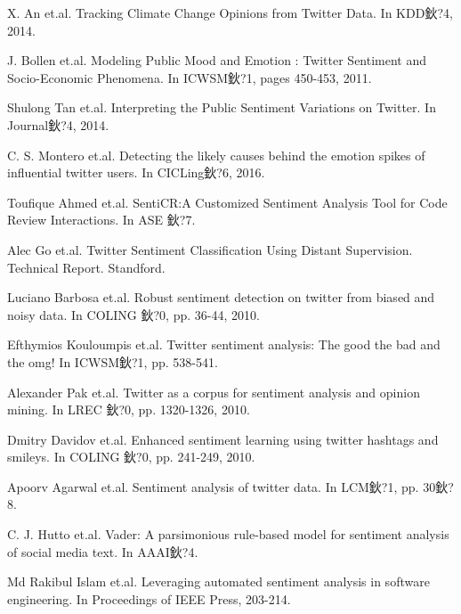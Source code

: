 \documentclass[runningheads]{llncs}
\begin{document}
\begin{thebibliography}{8}
X. An et.al.
\newblock Tracking Climate Change Opinions from Twitter Data. 
\newblock In KDD鈥?4, 2014.

J. Bollen et.al.
\newblock Modeling Public Mood and Emotion : Twitter Sentiment and Socio-Economic Phenomena. 
\newblock In ICWSM鈥?1, pages 450-453, 2011.

Shulong Tan et.al.
\newblock Interpreting the Public Sentiment Variations on Twitter. 
\newblock In Journal鈥?4, 2014.

C. S. Montero et.al.
\newblock Detecting the likely causes behind the emotion spikes of influential twitter users. 
\newblock In CICLing鈥?6, 2016.

Toufique Ahmed et.al.
\newblock SentiCR:A Customized Sentiment Analysis Tool for Code Review Interactions.
\newblock In ASE 鈥?7.

Alec Go et.al.
\newblock Twitter Sentiment Classification Using Distant Supervision.
\newblock Technical Report. Standford.

Luciano Barbosa et.al.
\newblock Robust sentiment detection on twitter from biased and noisy data.
\newblock In COLING 鈥?0, pp. 36-44, 2010.

Efthymios Kouloumpis et.al.
\newblock Twitter sentiment analysis: The good the bad and the omg!
\newblock In ICWSM鈥?1, pp. 538-541.

Alexander Pak et.al.
\newblock Twitter as a corpus for sentiment analysis and opinion mining.
\newblock In LREC 鈥?0, pp. 1320-1326, 2010.

Dmitry Davidov et.al.
\newblock Enhanced sentiment learning using twitter hashtags and smileys.
\newblock In COLING 鈥?0, pp. 241-249, 2010.

Apoorv Agarwal et.al.
\newblock Sentiment analysis of twitter data.
\newblock In LCM鈥?1, pp. 30鈥?8.

C. J. Hutto et.al.
\newblock Vader: A parsimonious rule-based model for sentiment analysis of social media text.
\newblock In AAAI鈥?4.

Md Rakibul Islam et.al.
\newblock Leveraging automated sentiment analysis in software engineering. 
\newblock In Proceedings of IEEE Press, 203-214.


\end{thebibliography}
\end{document}
